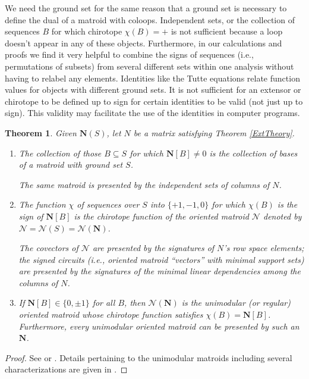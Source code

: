 \documentclass[12pt]{article}
\newtheorem{theorem}{Theorem}[section]
\theoremstyle{definition}
\newcommand{\ext}[1]{\ensuremath{\mathbf{#1}}}
\begin{document}
We need the ground set for the same reason that a ground set is necessary
to define the dual of a matroid with coloops.  Independent sets, or
the collection of sequences $B$ for which chirotope $\chi(B)=+$ is not
sufficient because a loop doesn't appear in any of these objects.  
Furthermore, in our calculations and proofs
we find it very helpful to combine the signs of 
sequences (i.e., permutations of subsets) from several different sets
within one analysis without having to relabel any elements.
Identities like the Tutte equations
relate function values for objects with 
different ground sets.  It is not sufficient for
an extensor or chirotope to be defined up to sign for certain
identities to be valid (not just up to sign).  This validity may
facilitate the use of the identities in computer programs.

\begin{theorem}
Given 
$\ext{N}(S)$, let $N$ be a matrix
satisfying Theorem \ref{ExtTheory}.
\begin{enumerate}
\item
The collection of those $B\subseteq S$ for which $\ext{N}[B]\neq 0$ is the
collection of bases of a matroid with ground set $S$.  

The same matroid is presented by the independent sets of columns of $N$.
\item
The function $\chi$ of sequences over 
$S$ into $\{+1,-1,0\}$ for which
$\chi(B)$ is the sign of $\ext{N}[B]$ is the chirotope function of the
oriented matroid $\mathcal{N}$ denoted by 
$\mathcal{N}=\mathcal{N}(S)=\mathcal{N}(\ext{N})$.

The covectors of $\mathcal{N}$ are presented by the 
signatures of $N$'s row space elements; the signed
circuits (i.e., oriented matroid ``vectors'' with minimal support sets)
are presented by the signatures of the minimal linear dependencies 
among the columns of $N$.

\item
If $\ext{N}[B]\in \{0,\pm 1\}$ 
for all $B$, then $\mathcal{N}(\ext{N})$ is 
the unimodular (or regular) oriented matroid whose chirotope
function satisfies $\chi(B)=\ext{N}[B]$.  Furthermore,
every unimodular oriented matroid can be presented by such an 
$\ext{N}$.

\end{enumerate}
\end{theorem}

\begin{proof}
See \cite{OMBOOK} or \cite[chap. 5]{BachemKern}.  Details pertaining to 
the unimodular matroids including several characterizations are given
in \cite[Theorem 3.1.1, p. 41]{CombinatorialGeometries}.
\end{proof}
\end{document}
